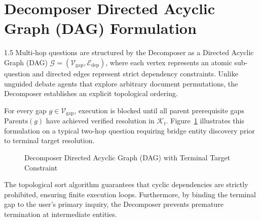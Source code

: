 \documentclass[12pt,a4paper]{report}
\begin{document}
\section{Decomposer Directed Acyclic Graph (DAG) Formulation}
\begin{spacing}{1.5}
Multi-hop questions are structured by the Decomposer as a Directed Acyclic Graph (DAG) $\mathcal{G} = (\mathcal{V}_{\text{gap}}, \mathcal{E}_{\text{dep}})$, where each vertex represents an atomic sub-question and directed edges represent strict dependency constraints. Unlike unguided debate agents that explore arbitrary document permutations, the Decomposer establishes an explicit topological ordering. 

For every gap $g \in \mathcal{V}_{\text{gap}}$, execution is blocked until all parent prerequisite gaps $\text{Parents}(g)$ have achieved verified resolution in $\mathcal{K}_t$. Figure~\ref{fig:dag_example} illustrates this formulation on a typical two-hop question requiring bridge entity discovery prior to terminal target resolution.

\begin{figure}[!htbp]
\centering
{}
\caption{Decomposer Directed Acyclic Graph (DAG) with Terminal Target Constraint}
\label{fig:dag_example}
\end{figure}

The topological sort algorithm guarantees that cyclic dependencies are strictly prohibited, ensuring finite execution loops. Furthermore, by binding the terminal gap to the user's primary inquiry, the Decomposer prevents premature termination at intermediate entities.
\end{spacing}
\end{document}
